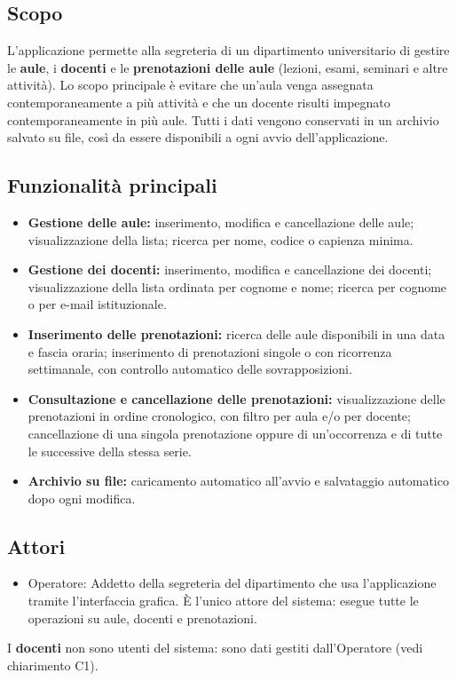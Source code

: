
\subsection{Scopo}
L'applicazione permette alla segreteria di un dipartimento universitario di gestire le \textbf{aule}, i \textbf{docenti} e le \textbf{prenotazioni delle aule} (lezioni, esami, seminari e altre attività). Lo scopo principale è evitare che un'aula venga assegnata contemporaneamente a più attività e che un docente risulti impegnato contemporaneamente in più aule. Tutti i dati vengono conservati in un archivio salvato su file, così da essere disponibili a ogni avvio dell'applicazione.

\subsection{Funzionalità principali}
\begin{itemize}
\item \textbf{Gestione delle aule:} inserimento, modifica e cancellazione delle aule; visualizzazione della lista; ricerca per nome, codice o capienza minima.
\item \textbf{Gestione dei docenti:} inserimento, modifica e cancellazione dei docenti; visualizzazione della lista ordinata per cognome e nome; ricerca per cognome o per e-mail istituzionale.
\item \textbf{Inserimento delle prenotazioni:} ricerca delle aule disponibili in una data e fascia oraria; inserimento di prenotazioni singole o con ricorrenza settimanale, con controllo automatico delle sovrapposizioni.
\item \textbf{Consultazione e cancellazione delle prenotazioni:} visualizzazione delle prenotazioni in ordine cronologico, con filtro per aula e/o per docente; cancellazione di una singola prenotazione oppure di un'occorrenza e di tutte le successive della stessa serie.
\item \textbf{Archivio su file:} caricamento automatico all'avvio e salvataggio automatico dopo ogni modifica.
\end{itemize}

\subsection{Attori}
\begin{itemize}
\item Operatore: Addetto della segreteria del dipartimento che usa l'applicazione tramite l'interfaccia grafica. È l'unico attore del sistema: esegue tutte le operazioni su aule, docenti e prenotazioni.
\end{itemize}
I \textbf{docenti} non sono utenti del sistema: sono dati gestiti dall'Operatore (vedi chiarimento C1).

